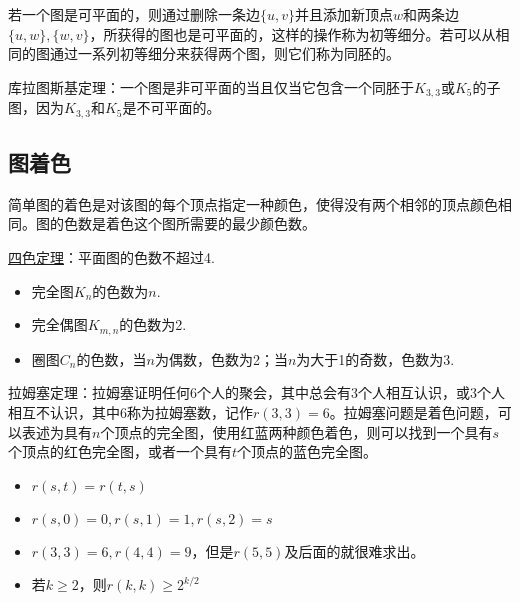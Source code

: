 若一个图是可平面的，则通过删除一条边$\{u,v\}$并且添加新顶点$w$和两条边$\{u,w\}, \{w,v\}$，所获得的图也是可平面的，这样的操作称为初等细分。若可以从相同的图通过一系列初等细分来获得两个图，则它们称为同胚的。

库拉图斯基定理：一个图是非可平面的当且仅当它包含一个同胚于$K_{3,3}$或$K_5$的子图，因为$K_{3,3}$和$K_5$是不可平面的。

\subsection{图着色}
简单图的着色是对该图的每个顶点指定一种颜色，使得没有两个相邻的顶点颜色相同。图的色数是着色这个图所需要的最少颜色数。

\uline{四色定理}：平面图的色数不超过4.

\begin{itemize}
    \item 完全图$K_n$的色数为$n$.
    \item 完全偶图$K_{m,n}$的色数为2.
    \item 圈图$C_n$的色数，当$n$为偶数，色数为2；当$n$为大于1的奇数，色数为3.
\end{itemize}

拉姆塞定理：拉姆塞证明任何6个人的聚会，其中总会有3个人相互认识，或3个人相互不认识，其中6称为拉姆塞数，记作$r(3,3) = 6$。拉姆塞问题是着色问题，可以表述为具有$n$个顶点的完全图，使用红蓝两种颜色着色，则可以找到一个具有$s$个顶点的红色完全图，或者一个具有$t$个顶点的蓝色完全图。

\begin{itemize}
    \item $r(s,t) = r(t,s)$
    \item $r(s,0) = 0, r(s,1) = 1, r(s,2) = s$
    \item $r(3,3) = 6,r(4,4) = 9$，但是$r(5,5)$及后面的就很难求出。
    \item 若$k \ge 2$，则$r(k,k) \ge 2^{k/2}$ 
\end{itemize}